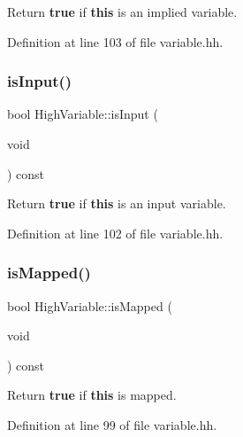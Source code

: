 Return {\bfseries{true}} if {\bfseries{this}} is an implied variable. 



Definition at line 103 of file variable.\+hh.

\mbox{\label{class_high_variable_afdf95522df96248264289c1b6b8df2e8}} 
\subsubsection{\texorpdfstring{isInput()}{isInput()}}
{\footnotesize\ttfamily bool High\+Variable\+::is\+Input (\begin{DoxyParamCaption}\item[{void}]{ }\end{DoxyParamCaption}) const\hspace{0.3cm}{\ttfamily [inline]}}



Return {\bfseries{true}} if {\bfseries{this}} is an input variable. 



Definition at line 102 of file variable.\+hh.

\mbox{\label{class_high_variable_abdda61fee37bd45139d757317876cab1}} 
\subsubsection{\texorpdfstring{isMapped()}{isMapped()}}
{\footnotesize\ttfamily bool High\+Variable\+::is\+Mapped (\begin{DoxyParamCaption}\item[{void}]{ }\end{DoxyParamCaption}) const\hspace{0.3cm}{\ttfamily [inline]}}



Return {\bfseries{true}} if {\bfseries{this}} is mapped. 



Definition at line 99 of file variable.\+hh.

\mbox{\label{class_high_variable_a63f59a7a1984e26d1fd6aa545f058637}} 
